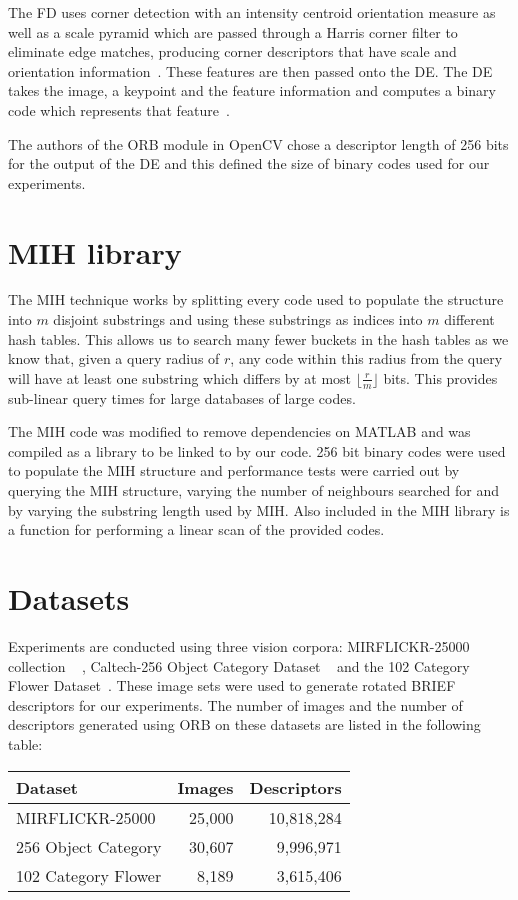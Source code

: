 The FD uses corner detection with an intensity centroid orientation measure as well as a scale pyramid which are passed through a Harris corner filter to eliminate edge matches, producing corner descriptors that have scale and orientation information~\cite{rublee2011orb}. These features are then passed onto the DE. The DE takes the image, a keypoint and the feature information and computes a binary code which represents that feature~\cite{rublee2011orb}.

The authors of the ORB module in OpenCV chose a descriptor length of 256 bits for the output of the DE and this defined the size of binary codes used for our experiments.

\section{MIH library}
The MIH technique works by splitting every code used to populate the structure into $m$ disjoint substrings and using these substrings as indices into $m$ different hash tables. This allows us to search many fewer buckets in the hash tables as we know that, given a query radius of $r$, any code within this radius from the query will have at least one substring which differs by at most $\lfloor \frac{r}{m} \rfloor$ bits. This provides sub-linear query times for large databases of large codes.
 
The MIH code was modified to remove dependencies on MATLAB and was compiled as a library to be linked to by our code. 256 bit binary codes were used to populate the MIH structure and performance tests were carried out by querying the MIH structure, varying the number of neighbours searched for and by varying the substring length used by MIH. Also included in the MIH library is a function for performing a linear scan of the provided codes.

\section{Datasets}
Experiments are conducted using three vision corpora: MIRFLICKR-25000 collection ~\cite{huiskes08} , Caltech-256 Object Category Dataset ~\cite{griffin2007caltech} and the 102 Category Flower Dataset~\cite{Nilsback08}. These image sets were used to generate rotated BRIEF descriptors for our experiments. The number of images and the number of descriptors generated using ORB on these datasets are listed in the following table:

\begin{center}
\begin{tabular}{| l | r | r |}
\hline
\bfseries Dataset & \bfseries Images & \bfseries Descriptors \\ \hline
MIRFLICKR-25000 & 25,000 & 10,818,284 \\ \hline
256 Object Category & 30,607 & 9,996,971 \\ \hline
102 Category Flower & 8,189 & 3,615,406 \\ \hline

\end{tabular}
\end{center}


